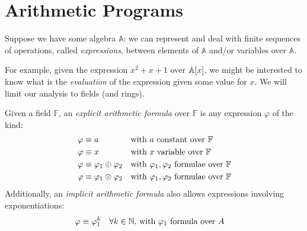 \section{Arithmetic Programs}
Suppose we have some algebra \(\mathbb{A}\): we can represent and deal with finite sequences of 
operations, called \emph{expressions}, between elements of \(\mathbb{A}\) and/or variables over 
\(\mathbb{A}\).

For example, given the expression \(x^2 + x + 1\) over \(\extend{\mathbb{A}}{x}\), we might be 
interested to know what is the \emph{evaluation} of the expression given some value for \(x\).
We will limit our analysis to fields (and rings).
\begin{definition}
  Given a field \(\mathbb{F}\), an \emph{explicit arithmetic formula} over \(\mathbb{F}\) is any 
  expression \(\varphi \) of the kind:
  \begin{align*}
    & \varphi \equiv a && \textnormal{with \(a\) constant over \(\mathbb{F}\)} \\ 
    & \varphi \equiv x && \textnormal{with \(x\) variable over \(\mathbb{F}\)} \\
    & \varphi \equiv \varphi_1 \oplus \varphi_2 && 
    \textnormal{with \(\varphi_1, \varphi_2\) formulae over \(\mathbb{F}\)} \\
    & \varphi \equiv \varphi_1 \otimes \varphi_2 && 
    \textnormal{with \(\varphi_1, \varphi_2\) formulae over \(\mathbb{F}\)}
  \end{align*}
  Additionally, an \emph{implicit arithmetic formula} also allows expressions involving 
  exponentiations:
  \begin{align*}
    & \varphi \equiv \varphi_{1}^{k} && 
    \textnormal{\(\forall k \in \mathbb{N}\), with \(\varphi_1\) formula over \(A\)}
  \end{align*}
\end{definition}


